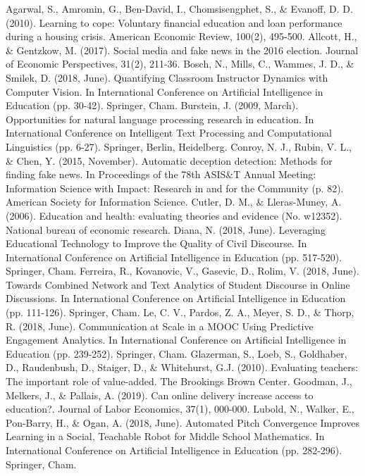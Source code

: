 \documentclass[12pt, final]{article}
\begin{document}
  \begin{thebibliography}{1}
   Agarwal, S., Amromin, G., Ben-David, I., Chomsisengphet, S., \& Evanoff, D. D. (2010). Learning to cope: Voluntary financial education and loan performance during a housing crisis. American Economic Review, 100(2), 495-500.
   Allcott, H., \& Gentzkow, M. (2017). Social media and fake news in the 2016 election. Journal of Economic Perspectives, 31(2), 211-36.
   Bosch, N., Mills, C., Wammes, J. D., \& Smilek, D. (2018, June). Quantifying Classroom Instructor Dynamics with Computer Vision. In International Conference on Artificial Intelligence in Education (pp. 30-42). Springer, Cham.
   Burstein, J. (2009, March). Opportunities for natural language processing research in education. In International Conference on Intelligent Text Processing and Computational Linguistics (pp. 6-27). Springer, Berlin, Heidelberg.
   Conroy, N. J., Rubin, V. L., \& Chen, Y. (2015, November). Automatic deception detection: Methods for finding fake news. In Proceedings of the 78th ASIS\&T Annual Meeting: Information Science with Impact: Research in and for the Community (p. 82). American Society for Information Science.
   Cutler, D. M., \& Lleras-Muney, A. (2006). Education and health: evaluating theories and evidence (No. w12352). National bureau of economic research.
    Diana, N. (2018, June). Leveraging Educational Technology to Improve the Quality of Civil Discourse. In International Conference on Artificial Intelligence in Education (pp. 517-520). Springer, Cham.
    Ferreira, R., Kovanovic, V., Gasevic, D., Rolim, V. (2018, June). Towards Combined Network and Text Analytics of Student Discourse in Online Discussions. In International Conference on Artificial Intelligence in Education (pp. 111-126). Springer, Cham.
    Le, C. V., Pardos, Z. A., Meyer, S. D., \& Thorp, R. (2018, June). Communication at Scale in a MOOC Using Predictive Engagement Analytics. In International Conference on Artificial Intelligence in Education (pp. 239-252). Springer, Cham.
     Glazerman, S., Loeb, S., Goldhaber, D., Raudenbush, D., Staiger, D., \& Whitehurst, G.J. (2010). Evaluating teachers: The important role of value-added. The Brookings Brown Center.
     Goodman, J., Melkers, J., \& Pallais, A. (2019). Can online delivery increase access to education?. Journal of Labor Economics, 37(1), 000-000.
     Lubold, N., Walker, E., Pon-Barry, H., \& Ogan, A. (2018, June). Automated Pitch Convergence Improves Learning in a Social, Teachable Robot for Middle School Mathematics. In International Conference on Artificial Intelligence in Education (pp. 282-296). Springer, Cham.

\end{thebibliography}
\end{document}
